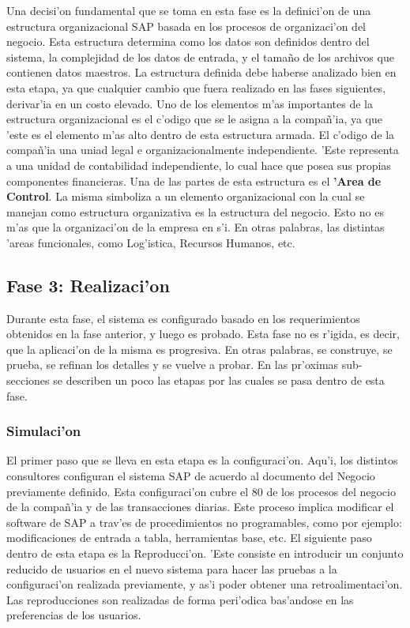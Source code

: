 Una decisi'on fundamental que se toma en esta fase es la definici'on de una estructura organizacional SAP basada en los procesos de organizaci'on del negocio. 
	Esta estructura determina como los datos son definidos dentro del sistema, la complejidad de los datos de entrada, y el tama\~no de los archivos que contienen datos maestros. 
	La estructura definida debe haberse analizado bien en esta etapa, ya que cualquier cambio que fuera realizado en las fases siguientes, derivar'ia en un costo elevado.
	Uno de los elementos m'as importantes de la estructura organizacional es el c'odigo que se le asigna a la compa\~n'ia, ya que 'este es el elemento m'as alto dentro de esta estructura armada. El c'odigo de la compa\~n'ia una uniad legal e organizacionalmente independiente. 'Este representa a una unidad de contabilidad independiente, lo cual hace que posea sus propias componentes financieras.
	Una de las partes de esta estructura es el \textbf{'Area de Control}. La misma simboliza a un elemento organizacional con la cual se manejan como estructura organizativa es la estructura del negocio. Esto no es m'as que la organizaci'on de la empresa en s'i. En otras palabras, las distintas 'areas funcionales, como Log'istica, Recursos Humanos, etc.
\subsection{Fase 3: Realizaci'on}
	Durante esta fase, el sistema es configurado basado en los requerimientos obtenidos en la fase anterior, y luego es probado. Esta fase no es r'igida, es decir, que la aplicaci'on de la misma es progresiva. En otras palabras, se construye, se prueba, se refinan los detalles y se vuelve a probar. En las pr'oximas sub-secciones se describen un poco las etapas por las cuales se pasa dentro de esta fase.

\subsubsection{Simulaci'on}
	El primer paso que se lleva en esta etapa es la configuraci'on. Aqu'i, los distintos consultores configuran el sistema SAP de acuerdo al documento del Negocio previamente definido.  Esta configuraci'on cubre el 80 de los procesos del negocio de la compa\~n'ia y de las transacciones diarias. Este proceso implica modificar el software de SAP a trav'es de procedimientos no programables, como por ejemplo:  modificaciones de entrada a tabla, herramientas base, etc.
	El siguiente paso dentro de esta etapa es la Reproducci'on. 'Este consiste en introducir un conjunto reducido de usuarios en el nuevo sistema para hacer las pruebas a la configuraci'on realizada previamente, y as'i poder obtener una retroalimentaci'on. Las reproducciones son realizadas de forma peri'odica bas'andose en las preferencias de los usuarios. 
	

